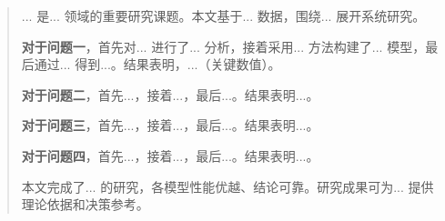 \maketitle%
\thispagestyle{plain}%
\begin{abstract}%

	... 是... 领域的重要研究课题。本文基于... 数据，围绕... 展开系统研究。

	\textbf{对于问题一}，首先对... 进行了... 分析，接着采用... 方法构建了... 模型，最后通过... 得到...。结果表明，...（关键数值）。

	\textbf{对于问题二}，首先...，接着...，最后...。结果表明...。

	\textbf{对于问题三}，首先...，接着...，最后...。结果表明...。

	\textbf{对于问题四}，首先...，接着...，最后...。结果表明...。

	本文完成了... 的研究，各模型性能优越、结论可靠。研究成果可为... 提供理论依据和决策参考。

\end{abstract}
